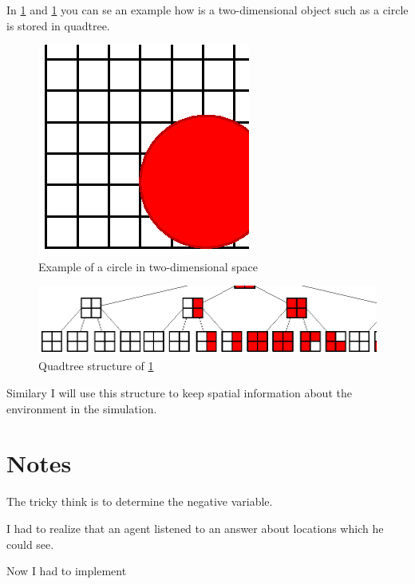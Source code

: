 In \ref{usedalgorithms:qtc} and \ref{usedalgorithms:qtc} you can se an example how is a two-dimensional object such as a circle is stored in quadtree.               
                  
\begin{figure}
  \centering                                      
  \includegraphics[scale=1]{diagrams/usedalgorithms/quadtree-circle.eps} 
  \caption{Example of a circle in two-dimensional space}      
  \label{usedalgorithms:qtc}
\end{figure}

\begin{figure}
  \centering                                
  \includegraphics[scale=.8]{diagrams/usedalgorithms/quadtree-treeview.eps} 
  \caption{Quadtree structure of \ref{usedalgorithms:qtc}}
  \label{usedalgorithms:qttv}
\end{figure}
 
Similary I will use this structure to keep spatial information about the environment in the simulation.

\section{Notes}

The tricky think is to determine the negative variable.

I had to realize that an agent listened to an answer about locations which he could see.

Now I had to implement
